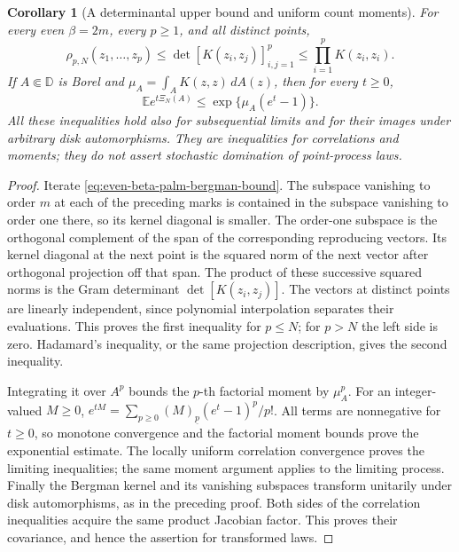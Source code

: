 \documentclass[11pt,a4paper]{article}
\numberwithin{equation}{section}
\newtheorem{corollary}[theorem]{Corollary}
\theoremstyle{definition}
\theoremstyle{remark}
\begin{document}
\begin{corollary}[A determinantal upper bound and uniform count moments]
\label{cor:even-beta-determinantal-upper-bound}
For every even $\beta=2m$, every $p\geq1$, and all distinct points,
\begin{equation}
 \rho_{p,N}(z_1,\ldots,z_p)
 \leq\det[K(z_i,z_j)]_{i,j=1}^p
 \leq\prod_{i=1}^p K(z_i,z_i).
 \label{eq:even-beta-determinantal-upper-bound}
\end{equation}
If $A\Subset\mathbb D$ is Borel and
$\mu_A=\int_A K(z,z)\,dA(z)$, then for every $t\geq0$,
\begin{equation}
 \mathbb E e^{t\Xi_N(A)}
 \leq \exp\{\mu_A(e^t-1)\}.
 \label{eq:even-beta-poisson-exponential-bound}
\end{equation}
All these inequalities hold also for subsequential limits and for
their images under arbitrary disk automorphisms. They are inequalities
for correlations and moments; they do not assert stochastic domination
of point-process laws.
\end{corollary}

\begin{proof}
Iterate \eqref{eq:even-beta-palm-bergman-bound}. The subspace vanishing
to order $m$ at each of the preceding marks is contained in the subspace
vanishing to order one there, so its kernel diagonal is smaller.
The order-one subspace is the orthogonal complement of the span of the
corresponding reproducing vectors. Its kernel diagonal at the next
point is the squared norm of the next vector after orthogonal projection
off that span. The product of these successive squared norms is the
Gram determinant $\det[K(z_i,z_j)]$. The vectors at distinct points
are linearly independent, since polynomial interpolation separates their
evaluations. This proves the first inequality for $p\leq N$; for $p>N$
the left side is zero. Hadamard's inequality, or the same projection
description, gives the second inequality.

Integrating it over $A^p$ bounds the $p$-th factorial moment by
$\mu_A^p$. For an integer-valued $M\geq0$,
$e^{tM}=\sum_{p\geq0}(M)_{\underline p}(e^t-1)^p/p!$.
All terms are nonnegative for $t\geq0$, so monotone convergence and
the factorial moment bounds prove the exponential estimate.
The locally uniform correlation convergence proves the limiting
inequalities; the same moment argument applies to the limiting process.
Finally the Bergman kernel and its vanishing subspaces transform
unitarily under disk automorphisms, as in the preceding proof.
Both sides of the correlation inequalities acquire the same product
Jacobian factor. This proves their covariance, and hence the assertion
for transformed laws.
\end{proof}
\end{document}
